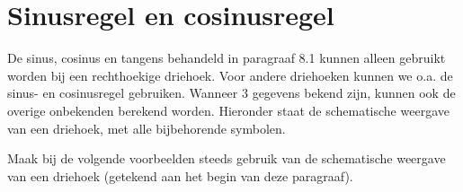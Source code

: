 \section{Sinusregel en cosinusregel}
De sinus, cosinus en tangens behandeld in paragraaf 8.1 kunnen alleen gebruikt worden bij een rechthoekige driehoek. Voor andere driehoeken kunnen we o.a. de sinus- en cosinusregel gebruiken. Wanneer 3 gegevens bekend zijn, kunnen ook de overige onbekenden berekend worden. Hieronder staat de schematische weergave van een driehoek, met alle bijbehorende symbolen.

\begin{center}
\end{center}



Maak bij de volgende voorbeelden steeds gebruik van de schematische weergave van een driehoek (getekend aan het begin van deze paragraaf).

